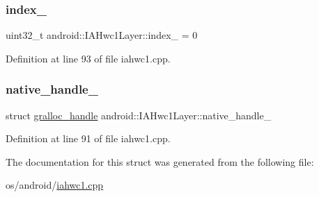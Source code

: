 \subsubsection{\texorpdfstring{index\+\_\+}{index\_}}
{\footnotesize\ttfamily uint32\+\_\+t android\+::\+I\+A\+Hwc1\+Layer\+::index\+\_\+ = 0}



Definition at line 93 of file iahwc1.\+cpp.

\mbox{\label{structandroid_1_1IAHwc1Layer_a81d694f9efc870a94da031fe93cedc2c}} 
\subsubsection{\texorpdfstring{native\+\_\+handle\+\_\+}{native\_handle\_}}
{\footnotesize\ttfamily struct \mbox{\hyperlink{structgralloc__handle}{gralloc\+\_\+handle}} android\+::\+I\+A\+Hwc1\+Layer\+::native\+\_\+handle\+\_\+}



Definition at line 91 of file iahwc1.\+cpp.



The documentation for this struct was generated from the following file\+:\begin{DoxyCompactItemize}
\item 
os/android/\mbox{\hyperlink{iahwc1_8cpp}{iahwc1.\+cpp}}\end{DoxyCompactItemize}
